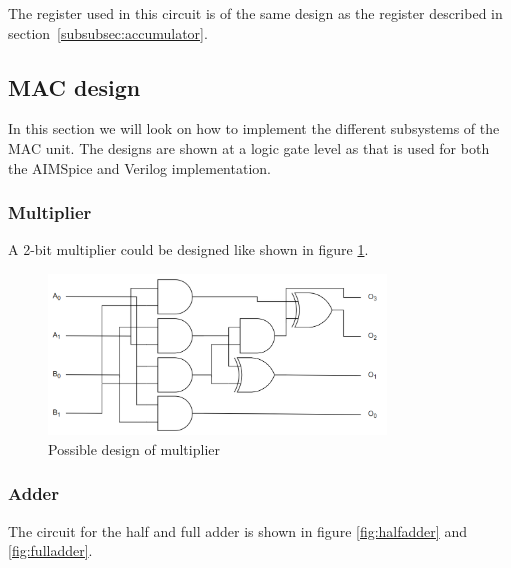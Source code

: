 \noindent
The register used in this circuit is of the same design as the register described in section~\ref{subsubsec:accumulator}.

\subsection{MAC design}
\label{subsec:circuitDesign}

In this section we will look on how to implement the different subsystems of the MAC unit. The designs are shown at a logic gate level as that is used for both the AIMSpice and Verilog implementation. 

\subsubsection{Multiplier} 

A 2-bit multiplier could be designed like shown in figure \ref{fig:multiplier}.

\begin{figure}[H]
    \centering
    \includegraphics[width=0.8\textwidth]{Figures/multiplier.png}
    \caption{Possible design of multiplier}
    \label{fig:multiplier}
\end{figure}

\subsubsection{Adder}
The circuit for the half and full adder is shown in figure \ref{fig:halfadder} and \ref{fig:fulladder}.

